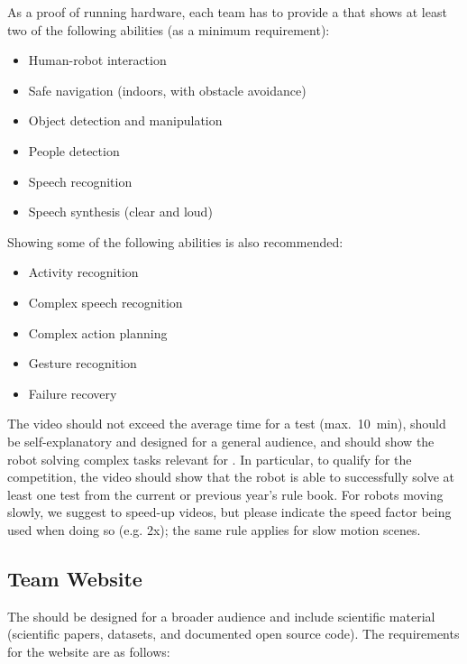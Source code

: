 As a proof of running hardware, each team has to provide a  that shows at least two of the following abilities (as a minimum requirement):
\begin{itemize}
	\item Human-robot interaction
	\item Safe navigation (indoors, with obstacle avoidance)
	\item Object detection and manipulation
	\item People detection
	\item Speech recognition
	\item Speech synthesis (clear and loud)
\end{itemize}
Showing some of the following abilities is also recommended:
\begin{itemize}
	\item Activity recognition
	\item Complex speech recognition
	\item Complex action planning
	\item Gesture recognition
	\item Failure recovery
\end{itemize}
The video should not exceed the average time for a test (max.~\SI{10}{\minute}), should be self-explanatory and designed for a general audience, and should show the robot solving complex tasks relevant for \AtHome.
In particular, to qualify for the competition, the video should show that the robot is able to successfully solve at least one test from the current or previous year's rule book.
For robots moving slowly, we suggest to speed-up videos, but please indicate the speed factor being used when doing so (e.g. 2x); the same rule applies for slow motion scenes.

\subsection{Team Website}

The  should be designed for a broader audience and include scientific material (scientific papers, datasets, and documented open source code).
The requirements for the website are as follows:

